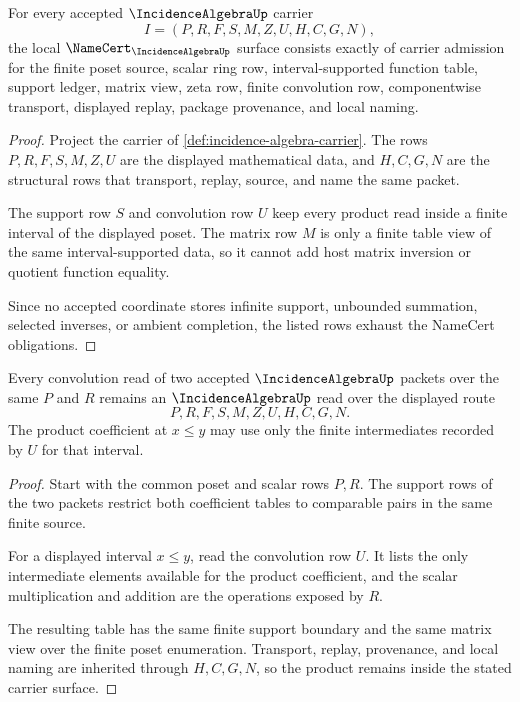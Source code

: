 \begin{theorem}
\label{thm:incidence-algebra-namecert-obligations}
For every accepted $\IncidenceAlgebraUp$ carrier
$$
I=(P,R,F,S,M,Z,U,H,C,G,N),
$$
the local $\NameCert_{\IncidenceAlgebraUp}$ surface consists exactly of carrier admission for the finite poset source, scalar ring row, interval-supported function table, support ledger, matrix view, zeta row, finite convolution row, componentwise transport, displayed replay, package provenance, and local naming.
\end{theorem}
\begin{proof}
Project the carrier of \autoref{def:incidence-algebra-carrier}. The rows $P,R,F,S,M,Z,U$ are the displayed mathematical data, and $H,C,G,N$ are the structural rows that transport, replay, source, and name the same packet.

The support row $S$ and convolution row $U$ keep every product read inside a finite interval of the displayed poset. The matrix row $M$ is only a finite table view of the same interval-supported data, so it cannot add host matrix inversion or quotient function equality.

Since no accepted coordinate stores infinite support, unbounded summation, selected inverses, or ambient completion, the listed rows exhaust the NameCert obligations.
\end{proof}

\begin{theorem}
\label{thm:incidence-algebra-convolution-stability}
Every convolution read of two accepted $\IncidenceAlgebraUp$ packets over the same $P$ and $R$ remains an $\IncidenceAlgebraUp$ read over the displayed route
$$
P,R,F,S,M,Z,U,H,C,G,N .
$$
The product coefficient at $x\leq y$ may use only the finite intermediates recorded by $U$ for that interval.
\end{theorem}
\begin{proof}
Start with the common poset and scalar rows $P,R$. The support rows of the two packets restrict both coefficient tables to comparable pairs in the same finite source.

For a displayed interval $x\leq y$, read the convolution row $U$. It lists the only intermediate elements available for the product coefficient, and the scalar multiplication and addition are the operations exposed by $R$.

The resulting table has the same finite support boundary and the same matrix view over the finite poset enumeration. Transport, replay, provenance, and local naming are inherited through $H,C,G,N$, so the product remains inside the stated carrier surface.
\end{proof}

